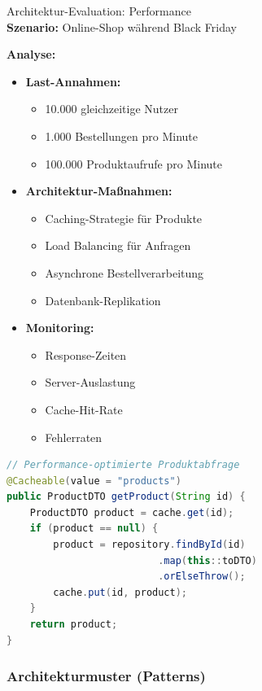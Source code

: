 \begin{example2}{Architektur-Evaluation: Performance}\\
\textbf{Szenario:} Online-Shop während Black Friday

\textbf{Analyse:}
\begin{itemize}
    \item \textbf{Last-Annahmen:}
    \begin{itemize}
        \item 10.000 gleichzeitige Nutzer
        \item 1.000 Bestellungen pro Minute
        \item 100.000 Produktaufrufe pro Minute
    \end{itemize}
    
    \item \textbf{Architektur-Maßnahmen:}
    \begin{itemize}
        \item Caching-Strategie für Produkte
        \item Load Balancing für Anfragen
        \item Asynchrone Bestellverarbeitung
        \item Datenbank-Replikation
    \end{itemize}
    
    \item \textbf{Monitoring:}
    \begin{itemize}
        \item Response-Zeiten
        \item Server-Auslastung
        \item Cache-Hit-Rate
        \item Fehlerraten
    \end{itemize}
\end{itemize}

\begin{lstlisting}[language=Java, style=basesmol]
// Performance-optimierte Produktabfrage
@Cacheable(value = "products")
public ProductDTO getProduct(String id) {
    ProductDTO product = cache.get(id);
    if (product == null) {
        product = repository.findById(id)
                          .map(this::toDTO)
                          .orElseThrow();
        cache.put(id, product);
    }
    return product;
}
\end{lstlisting}
\end{example2}

\subsubsection{Architekturmuster (Patterns)}

